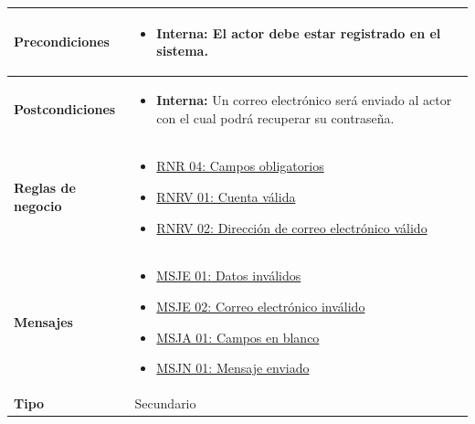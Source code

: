 \begin{center}
\begin{longtable}{| p{3.5cm} | p{11.5cm} |}
        \hline	
          \textbf{Precondiciones}& 
            \begin{itemize}
              \item \textbf{Interna:} El actor debe estar registrado en el sistema.
            \end{itemize} \\
        \hline	
          \textbf{Postcondiciones} & 
            \begin{itemize}
              \item \textbf{Interna:} Un correo electrónico será enviado al actor con el cual podrá recuperar su contraseña.
            \end{itemize} \\
       \hline    
          \textbf{Reglas de negocio} & 
          \begin{itemize}
         	  \item {\hyperref[rnr_04]{RNR 04: Campos obligatorios}}
         	  \item {\hyperref[rnr_01]{RNRV 01: Cuenta válida}}
         	  \item {\hyperref[rnr_02]{RNRV 02: Dirección de correo electrónico válido}}
	 \end{itemize} \\
       \hline
          \textbf{Mensajes} & 
         	\begin{itemize}
         	  \item {\hyperref[msje_01]{MSJE 01: Datos inválidos}}
         	  \item {\hyperref[msje_02]{MSJE 02: Correo electrónico inválido}}
         	  \item {\hyperref[msja_01]{MSJA 01: Campos en blanco}}
         	  \item {\hyperref[msjn_01]{MSJN 01: Mensaje enviado}}
	 \end{itemize} \\
       \hline
          \textbf{Tipo} & Secundario \\
       \hline	    
  \end{longtable}
\end{center}
\endgroup


